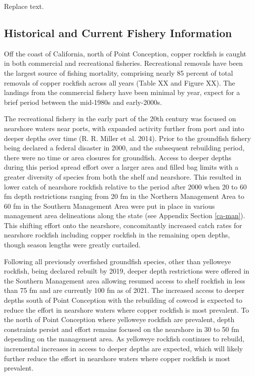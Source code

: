 \documentclass[11pt,
  english,
  letterpaper,
]{article}
\begin{document}
Replace text.

\hypertarget{historical-and-current-fishery-information}{%
\subsection{Historical and Current Fishery Information}\label{historical-and-current-fishery-information}}

Off the coast of California, north of Point Conception, copper rockfish is caught in both commercial and recreational fisheries. Recreational removals have been the largest source of fishing mortality, comprising nearly 85 percent of total removals of copper rockfish across all years (Table XX and Figure XX). The landings from the commercial fishery have been minimal by year, expect for a brief period between the mid-1980s and early-2000s.

The recreational fishery in the early part of the 20th century was focused on nearshore waters near ports, with expanded activity further from port and into deeper depths over time (R. R. Miller et al. 2014). Prior to the groundfish fishery being declared a federal disaster in 2000, and the subsequent rebuilding period, there were no time or area closures for groundfish. Access to deeper depths during this period spread effort over a larger area and filled bag limits with a greater diversity of species from both the shelf and nearshore. This resulted in lower catch of nearshore rockfish relative to the period after 2000 when 20 to 60 fm depth restrictions ranging from 20 fm in the Northern Management Area to 60 fm in the Southern Management Area were put in place in various management area delineations along the state (see Appendix Section \ref{ca-man}). This shifting effort onto the nearshore, concomitantly increased catch rates for nearshore rockfish including copper rockfish in the remaining open depths, though season lengths were greatly curtailed.

Following all previously overfished groundfish species, other than yelloweye rockfish, being declared rebuilt by 2019, deeper depth restrictions were offered in the Southern Management area allowing resumed access to shelf rockfish in less than 75 fm and are currently 100 fm as of 2021. The increased access to deeper depths south of Point Conception with the rebuilding of cowcod is expected to reduce the effort in nearshore waters where copper rockfish is most prevalent. To the north of Point Conception where yelloweye rockfish are prevalent, depth constraints persist and effort remains focused on the nearshore in 30 to 50 fm depending on the management area. As yelloweye rockfish continues to rebuild, incremental increases in access to deeper depths are expected, which will likely further reduce the effort in nearshore waters where copper rockfish is most prevalent.
\end{document}
